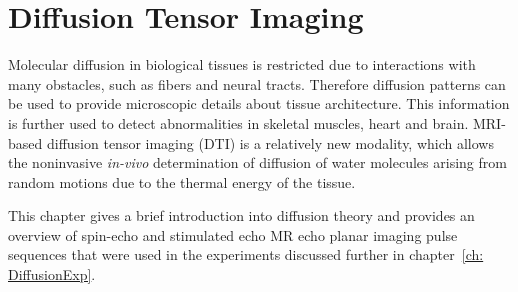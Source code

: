 \chapter{Diffusion Tensor Imaging}
\label{ch: Diffusion}
Molecular diffusion in biological tissues is restricted due to interactions with many obstacles, such as fibers and neural tracts. 
Therefore diffusion patterns can be used to provide microscopic details about tissue architecture. This information is further used to detect abnormalities in skeletal muscles, heart and brain. 
MRI-based diffusion tensor imaging (DTI) is a relatively new modality, which allows the noninvasive \textit{in-vivo} determination of diffusion of water molecules arising from random motions due to the thermal energy of the tissue.

This chapter gives a brief introduction into diffusion theory and provides an overview of spin-echo and stimulated echo MR echo planar imaging pulse sequences that were used in the experiments discussed further in chapter~\ref{ch: DiffusionExp}.

